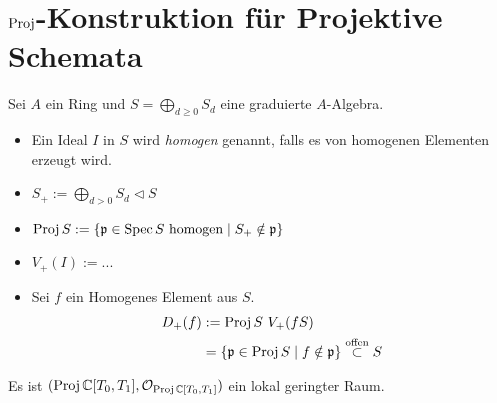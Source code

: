 \section{\boldmath$\operatorname{Proj}$-Konstruktion für Projektive Schemata}
\begin{comment}
siehe dazu
\begin{itemize}
\item 
\cite[Section 2.3.3]{liu2002algebraic}
\item 
\cite[Section 4.5]{ravil} 
\end{itemize}
\end{comment}
\begin{defn} 
Sei $A$ ein Ring und $S=\bigoplus_{d\geq0}S_d$ eine graduierte $A$-Algebra. 
\begin{itemize}
\item
Ein Ideal $I$ in $S$ wird \emph{homogen} genannt, falls es von homogenen
Elementen erzeugt wird. 
\item
$S_+:=\bigoplus_{d>0}S_d \vartriangleleft S$
\item
$\operatorname{Proj} S:=\{\mathfrak p \in\operatorname{Spec} S \text{ homogen} \mid
  S_+\notin\mathfrak p\}$
\item
$V_+(I):=...$
\item
Sei $f$ ein Homogenes Element aus $S$.
\begin{align*}
D_+(f)&:=\operatorname{Proj} S \ V_+(fS)
\\&=\left\{\mathfrak p \in\operatorname{Proj} S\mid f\notin \mathfrak p \right\}
  \overset{\text{offen}}\subset S
\end{align*}
\end{itemize}
\end{defn}

Es ist $(\operatorname{Proj} \mathbb{C}[T_0,T_1],\mathcal{O}_{\operatorname{Proj} \mathbb{C}[T_0,T_1]})$ ein lokal geringter Raum.

